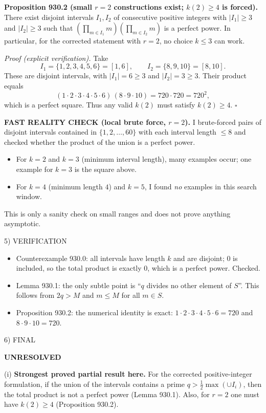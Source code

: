 \medskip
\textbf{Proposition 930.2 (small $r=2$ constructions exist; $k(2)\ge 4$ is forced).}
There exist disjoint intervals $I_1,I_2$ of consecutive positive integers with $|I_1|\ge 3$ and $|I_2|\ge 3$ such that
\((\prod_{m\in I_1}m)(\prod_{m\in I_2}m)\) is a perfect power.
In particular, for the corrected statement with $r=2$, no choice $k\le 3$ can work.

\emph{Proof (explicit verification).}
Take
\[
I_1=\{1,2,3,4,5,6\}=[1,6],\qquad I_2=\{8,9,10\}=[8,10].
\]
These are disjoint intervals, with $|I_1|=6\ge 3$ and $|I_2|=3\ge 3$. Their product equals
\[
(1\cdot2\cdot3\cdot4\cdot5\cdot6)\,(8\cdot9\cdot10)=720\cdot720=720^2,
\]
which is a perfect square.
Thus any valid $k(2)$ must satisfy $k(2)\ge 4$.
\hfill$\square$

\medskip
\textbf{FAST REALITY CHECK (local brute force, $r=2$).}
I brute-forced pairs of disjoint intervals contained in $\{1,2,\dots,60\}$ with each interval length $\le 8$ and checked whether the product of the union is a perfect power.
\begin{itemize}
\item For $k=2$ and $k=3$ (minimum interval length), many examples occur; one example for $k=3$ is the square above.
\item For $k=4$ (minimum length $4$) and $k=5$, I found \emph{no} examples in this search window.
\end{itemize}
This is only a sanity check on small ranges and does not prove anything asymptotic.

5) VERIFICATION

\begin{itemize}
\item Counterexample 930.0: all intervals have length $k$ and are disjoint; $0$ is included, so the total product is exactly $0$, which is a perfect power. Checked.
\item Lemma 930.1: the only subtle point is ``$q$ divides no other element of $S$''. This follows from $2q>M$ and $m\le M$ for all $m\in S$.
\item Proposition 930.2: the numerical identity is exact: $1\cdot2\cdot3\cdot4\cdot5\cdot6=720$ and $8\cdot9\cdot10=720$.
\end{itemize}

6) FINAL

\textbf{UNRESOLVED}

(i) \textbf{Strongest proved partial result here.}
For the corrected positive-integer formulation, if the union of the intervals contains a prime $q>\tfrac12\max(\cup I_i)$, then the total product is not a perfect power (Lemma 930.1). Also, for $r=2$ one must have $k(2)\ge 4$ (Proposition 930.2).

